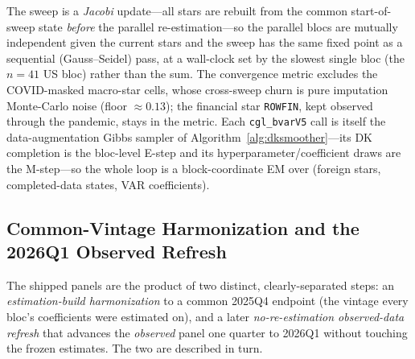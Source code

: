 \documentclass[11pt]{article}
\theoremstyle{definition}
\theoremstyle{remark}
\begin{document}
The sweep is a \emph{Jacobi} update---all stars are rebuilt from the
common start-of-sweep state \emph{before} the parallel re-estimation---so
the parallel blocs are mutually independent given the current stars and
the sweep has the same fixed point as a sequential (Gauss--Seidel) pass,
at a wall-clock set by the slowest single bloc (the $n=41$ US bloc)
rather than the sum. The convergence metric excludes the COVID-masked
macro-star cells, whose cross-sweep churn is pure imputation Monte-Carlo
noise (floor $\approx 0.13$); the financial star \texttt{ROWFIN}, kept
observed through the pandemic, stays in the metric. Each
\texttt{cgl\_bvarV5} call is itself the data-augmentation Gibbs sampler of
Algorithm~\ref{alg:dksmoother}---its DK completion is the bloc-level
E-step and its hyperparameter/coefficient draws are the M-step---so the
whole loop is a block-coordinate EM over (foreign stars,
completed-data states, VAR coefficients).

\subsection{Common-Vintage Harmonization and the 2026Q1 Observed
Refresh}\label{sec:vintage}

The shipped panels are the product of two distinct, clearly-separated
steps: an \emph{estimation-build harmonization} to a common 2025Q4
endpoint (the vintage every bloc's coefficients were estimated on), and a
later \emph{no-re-estimation observed-data refresh} that advances the
\emph{observed} panel one quarter to 2026Q1 without touching the frozen
estimates. The two are described in turn.
\end{document}
